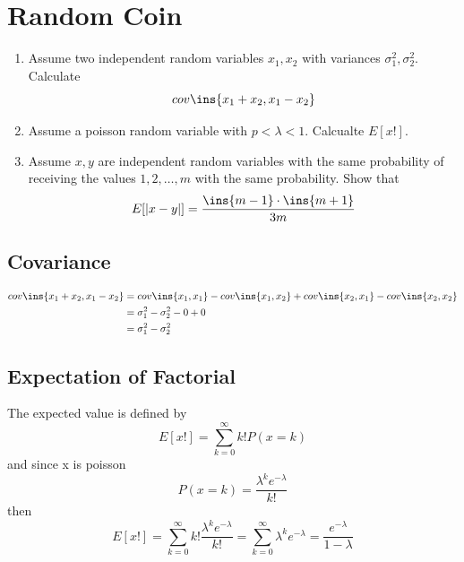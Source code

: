 \clearpage
\section{Random Coin}
\begin{colbox}
\begin{enumerate}
    \item Assume two independent random variables \(x_1, x_2\) with variances \(\sigma_1^2, \sigma_2^2\). Calculate \begin{equation}
        cov\ins{x_1+x_2,x_1-x_2}
    \end{equation}
    \item Assume a poisson random variable with \(p < \lambda < 1\). Calcualte \(E[x!]\).
    \item Assume \(x,y\) are independent random variables with the same probability of receiving the values \(1,2,\ldots,m\) with the same probability. Show that
    \begin{equation}
        E[\lvert x-y\rvert]=\frac{\ins{m-1}\cdot\ins{m+1}}{3m}
    \end{equation}
\end{enumerate}
\end{colbox}
\subsection{Covariance}
\begin{align}
    cov\ins{x_1+x_2,x_1-x_2} &= cov\ins{x_1,x_1}-cov\ins{x_1,x_2}+cov\ins{x_2,x_1}-cov\ins{x_2,x_2} \\
    &= \sigma_1^2-\sigma_2^2-0+0\\
    &= \sigma_1^2-\sigma_2^2
\end{align}
\subsection{Expectation of Factorial}
The expected value is defined by
\begin{equation}
    E[x!] = \sum_{k=0}^{\infty}k!P(x=k)
\end{equation}
and since x is poisson
\begin{equation}
    P(x=k)=\frac{\lambda^k e^{-\lambda}}{k!}
\end{equation}
then
\begin{equation}
    E[x!] = \sum_{k=0}^{\infty}k! \frac{\lambda^k e^{-\lambda}}{k!} = \sum_{k=0}^{\infty}\lambda^k e^{-\lambda} = \frac{e^{-\lambda}}{1-\lambda}
\end{equation}
